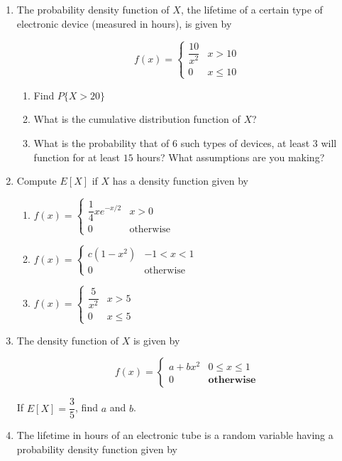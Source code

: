 \begin{enumerate}
\item The probability density function of $X$, the lifetime of a certain type of electronic device (measured in hours), is given by

$$f(x) = \begin{cases}
	\dfrac{10}{x^2} & x > 10\\
	0 & x \leq 10
\end{cases}$$
	\begin{enumerate}
	\item Find $P\{X > 20\}$
	\item What is the cumulative distribution function of $X$?
	\item What is the probability that of $6$ such types of devices, at least $3$ will function for at least $15$ hours? What assumptions are you making?
	\end{enumerate}
	
\item Compute $E[X]$ if $X$ has a density function given by

	\begin{enumerate}
	\item $f(x) = \begin{cases}
		\dfrac{1}{4}xe^{-x/2} & x>0\\
		0 & \text{otherwise}
	\end{cases}$
	\item $f(x) = \begin{cases}
		c(1 - x^2) & -1 < x < 1\\
		0 & \text{otherwise}
	\end{cases}$
	\item $f(x) = \begin{cases}
		\dfrac{5}{x^2} & x> 5\\
		0 & x \leq 5
	\end{cases}$
	\end{enumerate}

\item The density function of $X$ is given by

$$f(x) = \begin{cases}
	a + bx^2 & 0 \leq x \leq 1\\
	0 & \textbf{otherwise}
\end{cases}$$

If $E[X] = \dfrac{3}{5}$, find $a$ and $b$.

\newpage

\item The lifetime in hours of an electronic tube is a random variable having a probability density function given by


\end{enumerate}
